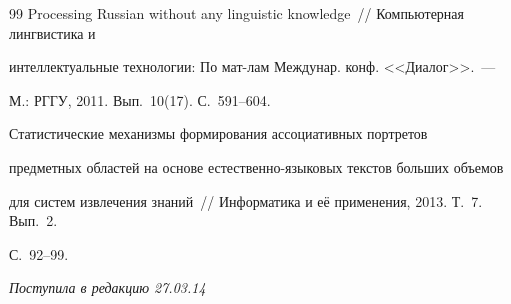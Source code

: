 {{\begin{thebibliography}{99}
Processing Russian without any linguistic knowledge~/\!\!/ Компьютерная лингвистика и


интеллектуальные технологии: По мат-лам Междунар. конф. <<Диалог>>.~---


М.: РГГУ, 2011. Вып.~10(17). С.~591--604.




 Статистические механизмы формирования ассоциативных портретов


предметных областей на основе естест\-вен\-но-язы\-ко\-вых текстов больших объемов


для систем извлечения знаний~/\!\!/ Информатика и её применения, 2013. Т.~7. Вып.~2.


С.~92--99.


\end{thebibliography}


}


}





\vspace*{-6pt}





\hfill{\small\textit{Поступила в редакцию 27.03.14}}




























\newpage





\def\tit{METHOD FOR EXTRACTING SINGLE-WORD TRANSLATION


CORRESPONDENCES FROM~PARALLEL TEXTS USING~DISTRIBUTIONAL SEMANTICS MODELS}





